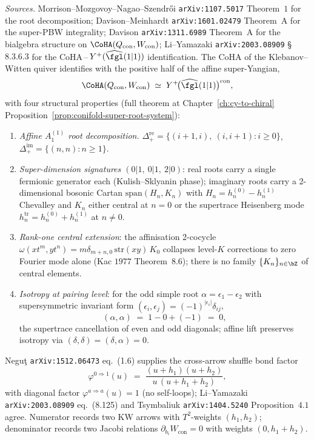 \begin{proposition}
\label{prop:conifold-super-root-system-toric}
\noindent\emph{Sources.} Morrison--Mozgovoy--Nagao--Szendr\H{o}i
\texttt{arXiv:1107.5017} Theorem~$1$ for the root decomposition;
Davison--Meinhardt \texttt{arXiv:1601.02479} Theorem~A for the
super-PBW integrality; Davison \texttt{arXiv:1311.6989} Theorem~A for
the bialgebra structure on $\CoHA(Q_{\mathrm{con}}, W_{\mathrm{con}})$;
Li--Yamazaki \texttt{arXiv:2003.08909} \S$8.3.6.3$ for the CoHA$\,$--$\,Y^+(\widehat{\fgl}(1|1))$ identification.
The CoHA of the Klebanov--Witten quiver identifies with the positive
half of the affine super-Yangian,
\[
 \CoHA(Q_{\mathrm{con}}, W_{\mathrm{con}})
 \;\simeq\;
 Y^+\!\bigl(\widehat{\fgl}(1|1)\bigr)^{\mathrm{con}},
\]
with four structural properties \textup{(}full theorem at
Chapter~\ref{ch:cy-to-chiral}
Proposition~\ref{prop:conifold-super-root-system}\textup{):}
\begin{enumerate}[label=\textup{(\roman*)}]
\item \emph{Affine $A_1^{(1)}$ root decomposition.}
 $\Delta_+^{\mathrm{re}} = \{(i{+}1, i),\ (i, i{+}1) : i \geq 0\}$,
 $\Delta_+^{\mathrm{im}} = \{(n, n) : n \geq 1\}$.
\item \emph{Super-dimension signatures $(0|1,\ 0|1,\ 2|0)$}:
 real roots carry a single fermionic
 generator each \textup{(}Kulish--Sklyanin phase\textup{);} imaginary
 roots carry a 2-dimensional bosonic Cartan
 $\mathrm{span}(H_n, K_n)$ with $H_n = h^{(0)}_n - h^{(1)}_n$
 Chevalley and $K_n$ either central at $n = 0$ or the supertrace
 Heisenberg mode $h^{\mathrm{tr}}_n = h^{(0)}_n + h^{(1)}_n$ at
 $n \neq 0$.
\item \emph{Rank-one central extension}:
 the affinisation 2-cocycle $\omega(x t^m, y t^n) = m \delta_{m+n, 0}\,
 \mathrm{str}(xy)\, K_0$ collapses level-$K$ corrections to zero
 Fourier mode alone \textup{(}Kac $1977$ Theorem~$8.6$\textup{);}
 there is no family $\{K_n\}_{n \in \bZ}$ of central elements.
\item \emph{Isotropy at pairing level}:
 for the odd simple root $\alpha = \epsilon_1 - \epsilon_2$ with
 supersymmetric invariant form $(\epsilon_i, \epsilon_j) = (-1)^{|\epsilon_i|}\delta_{ij}$,
 \[
 (\alpha, \alpha) \;=\; 1 - 0 + (-1) \;=\; 0,
 \]
 the supertrace cancellation of even and odd diagonals; affine lift
 preserves isotropy via $(\delta, \delta) = (\delta, \alpha) = 0$.
\end{enumerate}
Negu\c{t} \texttt{arXiv:1512.06473} eq.~(1.6) supplies the cross-arrow
shuffle bond factor
\[
 \varphi^{0 \Rightarrow 1}(u) \;=\;
 \frac{(u + h_1)(u + h_2)}{u\,(u + h_1 + h_2)},
\]
with diagonal factor $\varphi^{a \Rightarrow a}(u) = 1$ \textup{(}no
self-loops\textup{);} Li--Yamazaki \texttt{arXiv:2003.08909} eq.~(8.125)
and Tsymbaliuk \texttt{arXiv:1404.5240} Proposition~$4.1$ agree.
Numerator records two KW arrows with $T^2$-weights $(h_1, h_2)$;
denominator records two Jacobi relations $\partial_{b_i} W_{\mathrm{con}}
= 0$ with weights $(0, h_1 + h_2)$.
\end{proposition}

